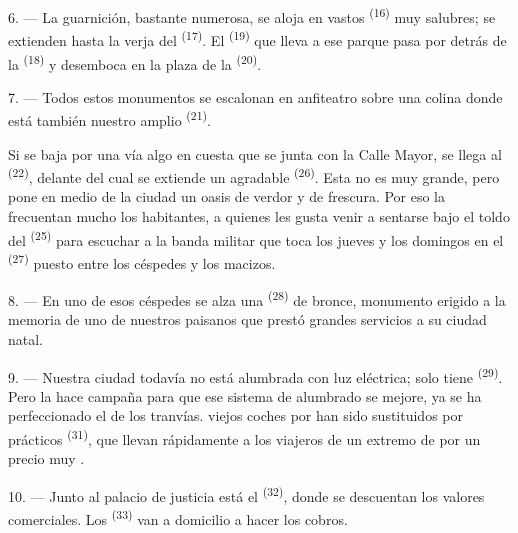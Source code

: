 \VUsaut{5.0mm}
\VUsaut{3.4mm}

6. --- La guarnición, bastante numerosa, se aloja en vastos
 \textsuperscript{(16)} muy salubres; se extienden hasta la verja
del  \textsuperscript{(17)}. El
 \textsuperscript{(19)}
que lleva a ese parque pasa por detrás de la 
\textsuperscript{(18)} y desemboca en la plaza de la  \textsuperscript{(20)}.

7. --- Todos estos monumentos se escalonan en anfiteatro sobre una colina
donde está también nuestro amplio  \textsuperscript{(21)}.

Si se baja por una vía algo en cuesta que se junta con la Calle Mayor, se
llega al  \textsuperscript{(22)}, delante del cual se
extiende un agradable  \textsuperscript{(26)}. Esta
 no es muy grande, pero pone en medio de la ciudad
un oasis de verdor y de frescura. Por eso la frecuentan mucho los
habitantes, a quienes les gusta venir a sentarse bajo el toldo del
 \textsuperscript{(25)} para escuchar a la banda militar que toca los
jueves y los domingos en el  \textsuperscript{(27)} puesto entre los
céspedes y los macizos.

8. --- En uno de esos céspedes se alza una  \textsuperscript{(28)} de
bronce, monumento erigido a la memoria de uno de nuestros paisanos que
prestó grandes servicios a su ciudad natal.

\VUsaut{4.0mm}
\VUsaut{3.4mm}

9. --- Nuestra ciudad todavía no está alumbrada con luz eléctrica; solo
tiene  \textsuperscript{(29)}. Pero la 
hace campaña para que ese sistema de alumbrado se mejore, 
ya se ha perfeccionado el  de los tranvías.
 viejos coches  por  han sido
sustituidos por prácticos  \textsuperscript{(31)}, que
llevan rápidamente a los viajeros de un extremo de  por un precio muy .

10. --- Junto al palacio de justicia está el  \textsuperscript{(32)},
donde se descuentan los valores comerciales. Los  \textsuperscript{(33)} van a domicilio a hacer los cobros.

